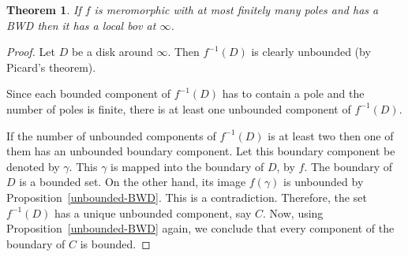 \documentclass[10pt,a4paper]{amsart}
\newtheorem{theorem}{Theorem}
\begin{document}
	\begin{theorem}
		If $f$ is meromorphic with at most finitely many poles and has a BWD then it has a local bov at $\infty$.
		\label{BWD-LOCALBOV}
	\end{theorem}

	\begin{proof} Let $D$ be a disk around $\infty$. Then $f^{-1}(D)$ is clearly unbounded (by Picard's theorem). 
		\par
		
		Since each bounded component of $f^{-1}(D)$ has to contain a pole and the number of poles is finite, there is at least one unbounded component of $f^{-1}(D)$. 
		
		\par	
		If the number of unbounded components of $f^{-1}(D)$ is at least two  then one of them has an unbounded boundary component. Let this boundary component be denoted by $\gamma$. This $\gamma$ is mapped into the boundary of $D$,  by $f$. The boundary of $D$ is a bounded set. On the other hand, its image $f(\gamma)$ is unbounded by Proposition~\ref{unbounded-BWD}. This is a contradiction.
		Therefore, the set $f^{-1}(D)$ has a unique  unbounded component, say $C$. Now, using Proposition~\ref{unbounded-BWD} again, we conclude that every component of the boundary of $C$ is  bounded.
	\end{proof} 
\end{document}
